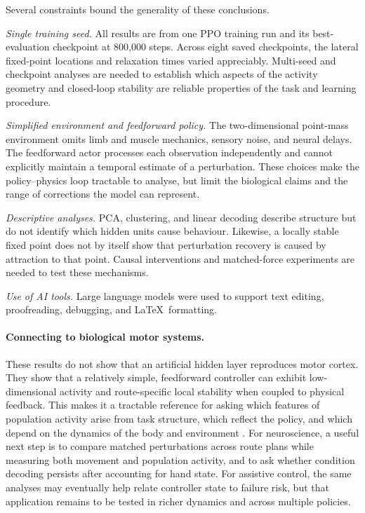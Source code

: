 \documentclass{article}
\begin{document}
Several constraints bound the generality of these conclusions.

\textit{Single training seed.}
All results are from one PPO training run and its best-evaluation
checkpoint at 800,000 steps. Across eight saved checkpoints, the lateral
fixed-point locations and relaxation times varied appreciably. Multi-seed
and checkpoint analyses are needed to establish which aspects of the
activity geometry and closed-loop stability are reliable properties of
the task and learning procedure.

\textit{Simplified environment and feedforward policy.}
The two-dimensional point-mass environment omits limb and muscle mechanics,
sensory noise, and neural delays. The feedforward actor processes each
observation independently and cannot explicitly maintain a temporal
estimate of a perturbation. These choices make the policy--physics loop
tractable to analyse, but limit the biological claims and the range of
corrections the model can represent.

\textit{Descriptive analyses.}
PCA, clustering, and linear decoding describe structure but do not
identify which hidden units cause behaviour. Likewise, a locally stable
fixed point does not by itself show that perturbation recovery is caused
by attraction to that point. Causal interventions and matched-force
experiments are needed to test these mechanisms.

\textit{Use of AI tools.}
Large language models were used to support text editing, proofreading,
debugging, and \LaTeX\ formatting.

\paragraph{Connecting to biological motor systems.}

These results do not show that an artificial hidden layer reproduces motor
cortex. They show that a relatively simple, feedforward controller can
exhibit low-dimensional activity and route-specific local stability when
coupled to physical feedback. This makes it a tractable reference for
asking which features of population activity arise from task structure,
which reflect the policy, and which depend on the dynamics of the body and
environment \citep{Churchland2012,Gallego2017,Oby2019,Crevecoeur2019}.
For neuroscience, a useful next step is to compare matched perturbations
across route plans while measuring both movement and population activity,
and to ask whether condition decoding persists after accounting for hand
state. For assistive control, the same analyses may eventually help relate
controller state to failure risk, but that application remains to be
tested in richer dynamics and across multiple policies.
\end{document}
